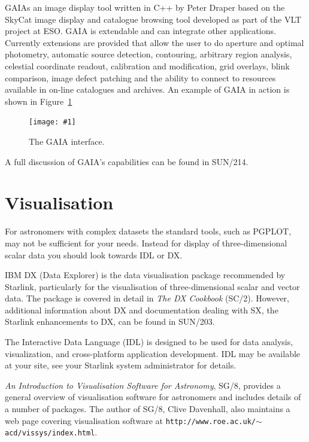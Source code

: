 \documentclass[twoside,11pt]{article}
\newcommand{\htmladdnormallink}[2]{#1}
\newcommand{\htmladdimg}[1]{}
\newcommand{\latex}[1]{#1}
\newcommand{\xref}[3]{#1}
\newcommand{\xlabel}[1]{}
\newcommand{\myfig} [5] {
  \begin{figure}
    \centering\texttt{[image: \#1]}
    \typeout{#1 inserted on page \arabic{page}}
    \caption{\label{#4}#5}
  \end{figure}
  }
\newcommand{\myfig}[5]{
    \label{#4} \htmladdimg{#3}\\
    Figure: #5\\
    }
\begin{document}
\xref{GAIA}{sun214} is an image display tool written in C++ by \htmladdnormallink{Peter Draper}{mailto:P.W.Draper@durham.ac.uk} based on the \htmladdnormallink{SkyCat}{http://archive.eso.org/skycat/} image display and catalogue browsing tool developed as part of the \htmladdnormallink{VLT}{http://www.eso.org/vlt/} project at \htmladdnormallink{ESO}{http://www.eso.org/}. GAIA is extendable and can integrate other applications. Currently extensions are provided that allow the user to do aperture and optimal photometry, automatic source detection, contouring, arbitrary region analysis, celestial coordinate readout, calibration and modification, grid overlays, blink comparison, image defect patching and the
ability to connect to resources available in on-line catalogues and archives. An example of GAIA in action is shown in Figure~\ref{sc15_gaia_interface}

\myfig{sc15_gaia.eps}{height=0.7\textheight}{sc15_gaia.gif}{sc15_gaia_interface}{The GAIA interface.} 

A full discussion of GAIA's capabilities can be found in \xref{SUN/214}{sun214}{}.

\section{\xlabel{sc15_visualisation}Visualisation\label{sc15_visualisation}}

For astronomers with complex datasets the standard tools, such as PGPLOT, may not be sufficient for your needs. Instead for display of three-dimensional scalar data you should look towards IDL or DX.

IBM DX (Data Explorer) is the data visualisation package recommended by Starlink, particularly for the visualisation of three-dimensional scalar and
vector data. The package is covered in detail in \xref{{\em The DX Cookbook} (SC/2)}{sc2}{}. However, additional information about DX and documentation dealing with SX, the Starlink enhancements to DX, can be found in \xref{SUN/203}{sun203}{}.

The \htmladdnormallink{Interactive Data Language}{http://www.rsinc.com/idl/index.cfm} (IDL) is designed to be used for data analysis, visualization, and cross-platform application development. IDL may be available at your site, see your Starlink system administrator for details.

\xref{{\em An Introduction to Visualisation Software for Astronomy}}{sg8}{}, SG/8, provides a general overview of visualisation software for astronomers and includes details of a number of packages. The author of SG/8, \htmladdnormallink{Clive Davenhall}{mailto:acd@roe.ac.uk},  also maintains a \htmladdnormallink{web page}{http://www.roe.ac.uk/~acd/vissys/index.html} covering visualisation software\latex{ at {\tt http://www.roe.ac.uk/$\sim$acd/vissys/index.html}}.
\end{document}
